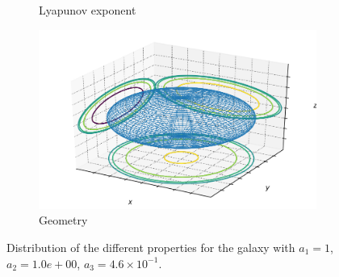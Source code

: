 \begin{figure}[h]
\begin{subfigure}[t]{0.4\textwidth}
        \caption{Lyapunov exponent}
    \end{subfigure}
    \begin{subfigure}[t]{0.4\textwidth}
        \includegraphics[width=\textwidth]{"../Files/Week 13/images/21_ellipsoid"}
        \caption{Geometry}
    \end{subfigure}
    \caption{Distribution of the different properties for the galaxy with $a_1 = 1$, $a_2 = 1.0e+00$, $a_3 = 4.6\times10^{-1}$.}
\end{figure}



